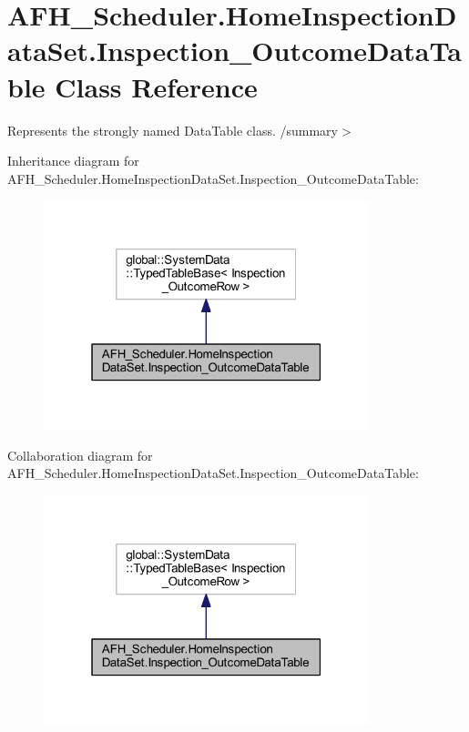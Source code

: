\section{A\+F\+H\+\_\+\+Scheduler.\+Home\+Inspection\+Data\+Set.\+Inspection\+\_\+\+Outcome\+Data\+Table Class Reference}
\label{class_a_f_h___scheduler_1_1_home_inspection_data_set_1_1_inspection___outcome_data_table}


Represents the strongly named Data\+Table class. /summary$>$  




Inheritance diagram for A\+F\+H\+\_\+\+Scheduler.\+Home\+Inspection\+Data\+Set.\+Inspection\+\_\+\+Outcome\+Data\+Table\+:
\nopagebreak
\begin{figure}[H]
\begin{center}
\leavevmode
\includegraphics[width=268pt]{class_a_f_h___scheduler_1_1_home_inspection_data_set_1_1_inspection___outcome_data_table__inherit__graph}
\end{center}
\end{figure}


Collaboration diagram for A\+F\+H\+\_\+\+Scheduler.\+Home\+Inspection\+Data\+Set.\+Inspection\+\_\+\+Outcome\+Data\+Table\+:
\nopagebreak
\begin{figure}[H]
\begin{center}
\leavevmode
\includegraphics[width=268pt]{class_a_f_h___scheduler_1_1_home_inspection_data_set_1_1_inspection___outcome_data_table__coll__graph}
\end{center}
\end{figure}
